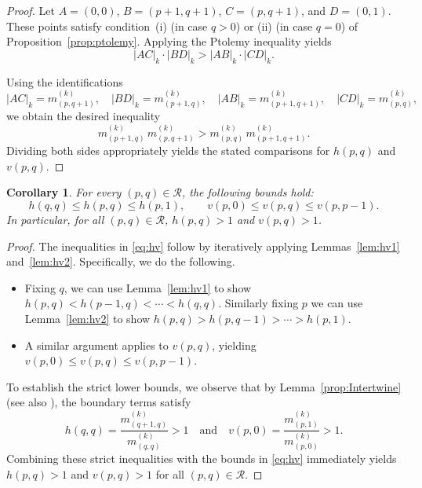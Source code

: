 \documentclass{article}
\newtheorem{cor}[theorem]{Corollary}
\theoremstyle{remark}
\begin{document}
\begin{proof}
Let $A = (0,0)$, $B = (p+1,q+1)$, $C = (p,q+1)$, and $D = (0,1)$.  
These points satisfy condition~(i) (in case $q>0$) or (ii) (in case $q=0$) of Proposition~\ref{prop:ptolemy}.  
Applying the Ptolemy inequality yields
\[
    |AC|_k \cdot |BD|_k > |AB|_k \cdot |CD|_k.
\]

Using the identifications
\[
    |AC|_k = m^{(k)}_{(p,q+1)}, \quad 
    |BD|_k = m^{(k)}_{(p+1,q)}, \quad 
    |AB|_k = m^{(k)}_{(p+1,q+1)}, \quad 
    |CD|_k = m^{(k)}_{(p,q)},
\]
we obtain the desired inequality
\[
    m^{(k)}_{(p+1,q)} \, m^{(k)}_{(p,q+1)}
    > 
    m^{(k)}_{(p,q)} \, m^{(k)}_{(p+1,q+1)}.
    \]
Dividing both sides appropriately yields the stated comparisons for $h(p,q)$ and $v(p,q)$.
\end{proof}

\begin{cor}\label{cor:hv_bounds}
For every $(p,q) \in \mathcal{R}$, the following bounds hold:
\begin{equation}\label{eq:hv}
    h(q,q) \leq h(p,q) \leq h(p,1), \qquad 
    v(p,0) \leq v(p,q) \leq v(p,p-1).
\end{equation}
In particular, for all $(p,q) \in \mathcal{R}$, $h(p,q) > 1$ and $v(p,q) > 1$. 
\end{cor}

\begin{proof}
The inequalities in \eqref{eq:hv} follow by iteratively applying Lemmas~\ref{lem:hv1} and~\ref{lem:hv2}. Specifically, we do the following.

\begin{itemize}
    \item Fixing $q$, we can use Lemma~\ref{lem:hv1} to show $h(p,q) < h(p-1,q) < \cdots < h(q,q)$. Similarly fixing $p$ we can use Lemma~\ref{lem:hv2} to show $h(p,q) > h(p,q-1)  > \cdots > h(p,1)$. 
    \item A similar argument applies to $v(p,q)$, yielding $v(p,0) \leq v(p,q) \leq v(p,p-1)$.
\end{itemize}

To establish the strict lower bounds, we observe that by Lemma~\ref{prop:Intertwine} (see also \cite{banaian2025}), the boundary terms satisfy
\[
    h(q,q) = \frac{m^{(k)}_{(q+1,q)}}{m^{(k)}_{(q,q)}} > 1 
    \quad \text{and} \quad 
    v(p,0) = \frac{m^{(k)}_{(p,1)}}{m^{(k)}_{(p,0)}} > 1.
\] 
Combining these strict inequalities with the bounds in \eqref{eq:hv} immediately yields $h(p,q) > 1$ and $v(p,q) > 1$ for all $(p,q)\in \mathcal{R}$. 
\end{proof}
\end{document}
